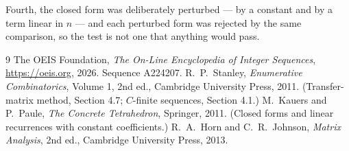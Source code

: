 \documentclass[11pt,a4paper]{article}
\theoremstyle{plain}
\theoremstyle{definition}
\begin{document}
Fourth, the closed form was deliberately perturbed --- by a constant and by a term linear in
$n$ --- and each perturbed form was rejected by the same comparison, so the test is not one
that anything would pass.

\begin{thebibliography}{9}
 The OEIS Foundation, \emph{The On-Line Encyclopedia of Integer
Sequences}, \url{https://oeis.org}, 2026. Sequence A224207.
 R.~P.~Stanley, \emph{Enumerative Combinatorics}, Volume 1, 2nd ed.,
Cambridge University Press, 2011. (Transfer-matrix method, Section 4.7; $C$-finite sequences,
Section 4.1.)
 M.~Kauers and P.~Paule, \emph{The Concrete Tetrahedron}, Springer, 2011.
(Closed forms and linear recurrences with constant coefficients.)
 R.~A.~Horn and C.~R.~Johnson, \emph{Matrix Analysis}, 2nd ed., Cambridge
University Press, 2013.
\end{thebibliography}
\end{document}
